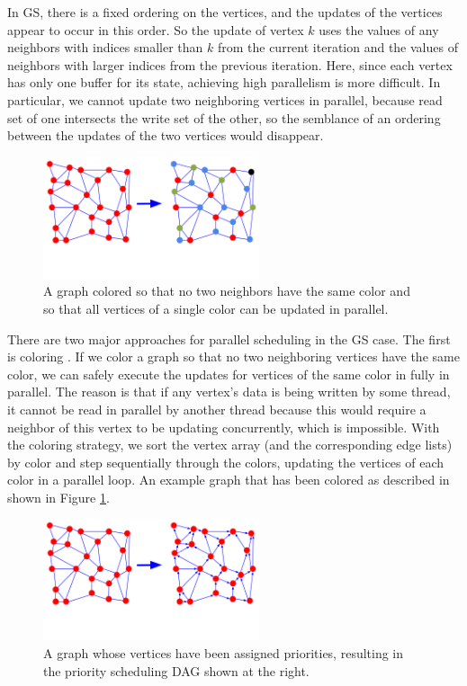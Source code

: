 \documentclass[journal]{IEEEtran}
\begin{document}
In GS, there is a fixed ordering on the vertices, and the updates of the vertices appear to occur in this order. So the update of vertex $k$ uses the values of any neighbors with indices smaller than $k$ from the current iteration and the values of neighbors with larger indices from the previous iteration. Here, since each vertex has only one buffer for its state, achieving high parallelism is more difficult. In particular, we cannot update two neighboring vertices in parallel, because read set of one intersects the write set of the other, so the semblance of an ordering between the updates of the two vertices would disappear.

\begin{figure}[!t]
\centering
\includegraphics[width=2.5in]{chromatic_scheduling}
\caption{A graph colored so that no two neighbors have the same color and so that all vertices of a single color can be updated in parallel.}
\label{fig_chrom}
\end{figure}

There are two major approaches for parallel scheduling in the GS case. The first is coloring \cite{chromatic}. If we color a graph so that no two neighboring vertices have the same color, we can safely execute the updates for vertices of the same color in fully in parallel. The reason is that if any vertex's data is being written by some thread, it cannot be read in parallel by another thread because this would require a neighbor of this vertex to be updating concurrently, which is impossible. With the coloring strategy, we sort the vertex array (and the corresponding edge lists) by color and step sequentially through the colors, updating the vertices of each color in a parallel loop. An example graph that has been colored as described in shown in Figure \ref{fig_chrom}. 

\begin{figure}[!t]
\centering
\includegraphics[width=2.5in]{dag_scheduling}
\caption{A graph whose vertices have been assigned priorities, resulting in the priority scheduling DAG shown at the right.}
\label{fig_dag}
\end{figure}
\end{document}
